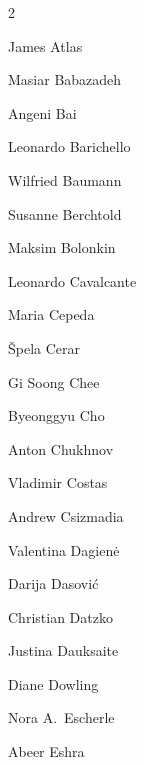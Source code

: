 \newchapter{\BrochureAuthors}
\label{authors}

\begin{multicols}{2}
 
   \ifdefined\AuthorAtlasJames {} James Atlas\fi

   \ifdefined\AuthorBabazadehMasiar {} Masiar Babazadeh\fi

   \ifdefined\AuthorBaiAngeni {} Angeni Bai\fi

   \ifdefined\AuthorBarichelloLeonardo {} Leonardo Barichello\fi

   \ifdefined\AuthorBaumannWilfried {} Wilfried Baumann\fi

   \ifdefined\AuthorBerchtoldSusanne {} Susanne Berchtold\fi

   \ifdefined\AuthorBolonkinMaksim {} Maksim Bolonkin\fi

   \ifdefined\AuthorCavalcanteLeonardo {} Leonardo Cavalcante\fi

   \ifdefined\AuthorCepedaMaria {} Maria Cepeda\fi

   \ifdefined\AuthorCerarSpela {} Špela Cerar\fi

   \ifdefined\AuthorCheeSoongGi {} Gi Soong Chee\fi

   \ifdefined\AuthorChoByeonggyu {} Byeonggyu Cho\fi

   \ifdefined\AuthorChukhnovAnton {} Anton Chukhnov\fi

   \ifdefined\AuthorCostasVladimir {} Vladimir Costas\fi

   \ifdefined\AuthorCsizmadiaAndrew {} Andrew Csizmadia\fi

   \ifdefined\AuthorDagieneValentina {} Valentina Dagienė\fi

   \ifdefined\AuthorDasovicDarija {} Darija Dasović\fi

   \ifdefined\AuthorDatzkoChristian {} Christian Datzko\fi

   \ifdefined\AuthorDauksaiteJustina {} Justina Dauksaite\fi

   \ifdefined\AuthorDowlingDiane {} Diane Dowling\fi

   \ifdefined\AuthorEscherleANora {} Nora A.~Escherle\fi

   \ifdefined\AuthorEshraAbeer {} Abeer Eshra\fi


\end{multicols}
